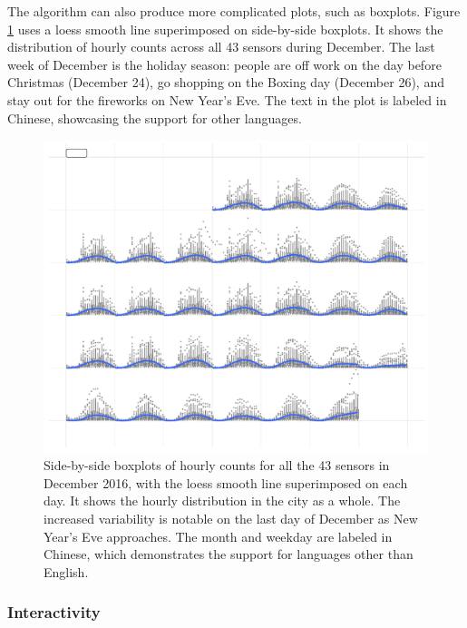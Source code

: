 \documentclass[12pt]{article}
\begin{document}
The algorithm can also produce more complicated plots, such as boxplots. Figure \ref{fig:chn} uses a loess smooth line \citep{cleveland1979loess} superimposed on side-by-side boxplots. It shows the distribution of hourly counts across all 43 sensors during December. The last week of December is the holiday season: people are off work on the day before Christmas (December 24), go shopping on the Boxing day (December 26), and stay out for the fireworks on New Year's Eve. The text in the plot is labeled in Chinese, showcasing the support for other languages.

\begin{figure}

{\centering \includegraphics[width=\textwidth]{figure/chn-1} 

}

\caption{Side-by-side boxplots of hourly counts for all the 43 sensors in December 2016, with the loess smooth line superimposed on each day. It shows the hourly distribution in the city as a whole. The increased variability is notable on the last day of December as New Year's Eve approaches. The month and weekday are labeled in Chinese, which demonstrates the support for languages other than English.}\label{fig:chn}
\end{figure}



\hypertarget{interactivity}{%
\subsubsection{Interactivity}\label{interactivity}}
\end{document}
